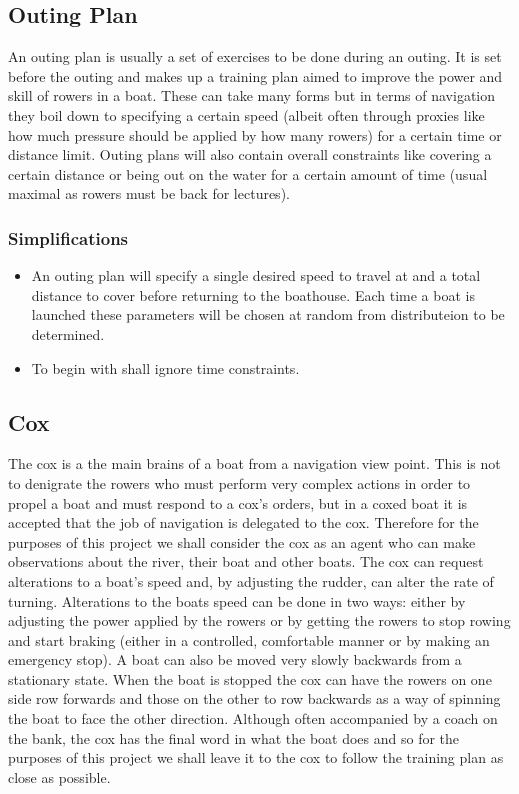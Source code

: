 \subsection{Outing Plan}
An outing plan is usually a set of exercises to be done during an
outing. It is set before the outing and makes up a training plan aimed
to improve the power and skill of rowers in a boat. These can take many forms but in terms of navigation they boil
down to specifying a certain speed (albeit often through proxies like
how much pressure should be applied by how many rowers) for a certain
time or distance limit. Outing plans will also contain overall
constraints like covering a certain distance or being out on the water
for a certain amount of time (usual maximal as rowers must be back for lectures).
\subsubsection{Simplifications}
\begin{itemize}
  \item An outing plan will specify a single desired speed to travel at
    and a total distance to cover before returning to the
    boathouse. Each time a boat is launched these parameters will be
    chosen at random from distributeion to be determined.
  \item To begin with shall ignore time constraints.
\end{itemize}

\subsection{Cox}
The cox is a the main brains of a boat from a navigation view
point. This is not to denigrate the rowers who must perform very
complex actions in order to propel a boat and must respond to a cox's
orders, but in a coxed boat it is accepted that the job of navigation
is delegated to the cox. Therefore for the purposes of this project we
shall consider the cox as an agent who can make observations about the
river, their boat and other boats. The cox can request alterations to
a boat's speed and, by adjusting the rudder, can alter the rate of
turning. Alterations to the boats speed can be done in two ways:
either by adjusting the power applied by the rowers or by getting the
rowers to stop rowing and start braking (either in a controlled, comfortable manner
or by making an emergency stop). A boat can also be moved very
slowly backwards from a stationary state. When the boat is stopped the
cox can have the rowers on one side row forwards and those on the other
to row backwards as a way of spinning the boat to face the other
direction. Although often accompanied by a coach on the bank, the cox
has the final word in what the boat does and so for the purposes of
this project we shall leave it to the cox to follow the training plan
as close as possible.
